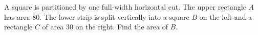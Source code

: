 A square is partitioned by one full-width horizontal cut. The upper rectangle $A$ has area $80$. The lower strip is split vertically into a square $B$ on the left and a rectangle $C$ of area $30$ on the right. Find the area of $B$.
